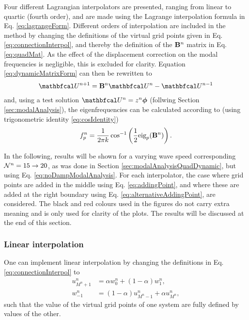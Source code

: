 Four different Lagrangian interpolators are presented, ranging from linear to quartic (fourth order), and are made using the Lagrange interpolation formula in Eq. \eqref{eq:lagrangeForm}. Different orders of interpolation are included in the method by changing the definitions of the virtual grid points given in Eq. \eqref{eq:connectionInterpol}, and thereby the definition of the $\mathbf{B}^n$ matrix in Eq. \eqref{eq:quadMat}. As the effect of the displacement correction on the modal frequencies is negligible, this is excluded for clarity. Equation \eqref{eq:dynamicMatrixForm} can then be rewritten to 
\begin{equation}
    \Ucal^{n+1} = \B^n \Ucal^n- \Ucal^{n-1}
\end{equation}
and, using a test solution $\Ucal^n = z^n\boldPhi$ (follwing Section \ref{sec:modalAnalysis}), the eigenfrequencies can be calculated according to (using trigonometric identity \eqref{eq:cosIdentity})
\begin{equation}\label{eq:noDampModalAnalysis}
    f_p^n = \frac{1}{2 \pi k}\cos^{-1}\left(\frac{1}{2}\text{eig}_p(\mathbf{B}^n)\right).
\end{equation}

In the following, results will be shown for a varying wave speed corresponding $\mathcal{N}^n = 15 \rightarrow 20$, as was done in Section \ref{sec:modalAnalysisQuadDynamic}, but using Eq. \eqref{eq:noDampModalAnalysis}. For each interpolator, the case where grid points are added in the middle using Eq. \eqref{eq:addingPoint}, and where these are added at the right boundary using Eq. \eqref{eq:alternativeAddingPoint}, are considered. The black and red colours used in the figures do not carry extra meaning and is only used for clarity of the plots. The results will be discussed at the end of this section. 
 
\subsubsection{Linear interpolation}
One can implement linear interpolation by changing the definitions in Eq. \eqref{eq:connectionInterpol} to
\begin{subequations}\label{eq:linearConnInterpol}
    \begin{align}
            u_{M^n+1}^n &= \alpha w_0^n + (1-\alpha)w_1^n,\label{eq:linearVirtU}\\
            w_{-1}^n &= (1-\alpha)u_{M^n-1}^n + \alpha u_{M^n}^n,
    \end{align}
\end{subequations}
such that the value of the virtual grid points of one system are fully defined by values of the other. 

